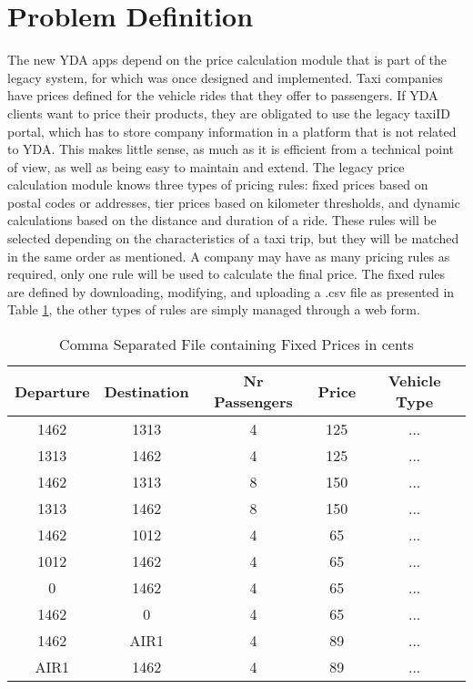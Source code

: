 %
\section{Problem Definition}
The new YDA apps depend on the price calculation module that is part of the legacy system, for which was once designed and implemented. Taxi companies have prices defined for the vehicle rides that they offer to passengers. If YDA clients want to price their products, they are obligated to use the legacy taxiID portal, which has to store company information in a platform that is not related to YDA. This makes little sense, as much as it is efficient from a technical point of view, as well as being easy to maintain and extend. The legacy price calculation module knows three types of pricing rules: fixed prices based on postal codes or addresses, tier prices based on kilometer thresholds, and dynamic calculations based on the distance and duration of a ride. These rules will be selected depending on the characteristics of a taxi trip, but they will be matched in the same order as mentioned. A company may have as many pricing rules as required, only one rule will be used to calculate the final price. The fixed rules are defined by downloading, modifying, and uploading a .csv file as presented in Table \ref{tab:fixedprices}, the other types of rules are simply managed through a web form.

\begin{table}[htbp!]
	\centering
	\begin{tabular}{c|c|c|c|c}
		\toprule
		Departure & Destination & Nr Passengers & Price & Vehicle Type \\
		\midrule
		1462      & 1313        & 4             & 125   & ...          \\
		1313      & 1462        & 4             & 125   & ...          \\
		1462      & 1313        & 8             & 150   & ...          \\
		1313      & 1462        & 8             & 150   & ...          \\
		1462      & 1012        & 4             & 65    & ...          \\
		1012      & 1462        & 4             & 65    & ...          \\
		0         & 1462        & 4             & 65    & ...          \\
		1462      & 0           & 4             & 65    & ...          \\
		1462      & AIR1        & 4             & 89    & ...          \\
		AIR1      & 1462        & 4             & 89    & ...          \\
		\bottomrule
	\end{tabular}
	\caption[Fixed Prices]{Comma Separated File containing Fixed Prices in cents}
	\label{tab:fixedprices}
\end{table}


